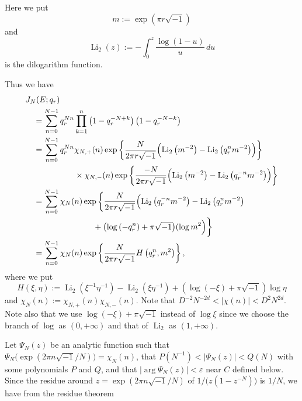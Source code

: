 \documentclass[a4paper]{amsart}
\theoremstyle{plain}
\theoremstyle{definition}
\theoremstyle{remark}
\newcommand{\Li}{\operatorname{Li}}
\numberwithin{equation}{section}
\begin{document}
Here we put
\begin{equation*}
  m:=\exp(\pi{r}\sqrt{-1})
\end{equation*}
and
\begin{equation*}
  \Li_2(z):=-\int_{0}^{z}\frac{\log(1-u)}{u}\,du
\end{equation*}
is the dilogarithm function.
\par
Thus we have
\begin{equation*}
\begin{split}
  &J_{N}(E;q_r)
  \\
  &\quad=
  \sum_{n=0}^{N-1}
  q_r^{Nn}
  \prod_{k=1}^{n}
  \left(1-q_r^{-N+k}\right)
  \left(1-q_r^{-N-k}\right)
  \\
  &\quad=
  \sum_{n=0}^{N-1}
  q_r^{Nn}
  \chi_{N,+}(n)
  \exp
  \left\{
    \frac{N}{2\pi{r}\sqrt{-1}}
    \Bigl(
      \Li_2\left(m^{-2}\right)-\Li_2\left(q_r^{n}m^{-2}\right)
    \Bigr)
  \right\}
  \\
  &\qquad\qquad\qquad\times
  \chi_{N,-}(n)
  \exp
  \left\{
    \frac{-N}{2\pi{r}\sqrt{-1}}
    \Bigl(
      \Li_2\left(m^{-2}\right)-\Li_2\left(q_r^{-n}m^{-2}\right)
    \Bigr)
  \right\}
  \\
  &\quad=
  \sum_{n=0}^{N-1}
  \chi_N(n)
  \exp
  \left\{
    \frac{N}{2\pi{r}\sqrt{-1}}
    \Bigl(
      \Li_2\left(q_r^{-n}m^{-2}\right)-\Li_2\left(q_r^{n}m^{-2}\right)
  \right.
  \\
  &\qquad\qquad\qquad\qquad
  \left.\vphantom{\frac{N}{2\pi{r}\sqrt{-1}}}
      +\bigl(\log\left(-q_r^n\right)+\pi\sqrt{-1}\bigr)(\log{m^2}
    \Bigr)
  \right\}
  \\
  &\quad=
  \sum_{n=0}^{N-1}
  \chi_N(n)
  \exp
  \left\{
    \frac{N}{2\pi{r}\sqrt{-1}}H\left(q_r^n,m^2\right)
  \right\},
\end{split}
\end{equation*}
where we put
\begin{equation*}
  H(\xi,\eta)
  :=
  \Li_2\left(\xi^{-1}\eta^{-1}\right)-\Li_2\left(\xi\eta^{-1}\right)
  +\left(\log(-\xi)+\pi\sqrt{-1}\right)\log{\eta}
\end{equation*}
and $\chi_N(n):=\chi_{N,+}(n)\chi_{N,-}(n)$.
Note that $D^{-2}N^{-2d}<|\chi(n)|<D^2N^{2d}$.
Note also that we use $\log(-\xi)+\pi\sqrt{-1}$ instead of $\log\xi$ since we choose the branch of $\log$ as $(0,+\infty)$ and that of $\Li_2$ as $(1,+\infty)$.
\par
Let $\Psi_N(z)$ be an analytic function such that $\Psi_N\bigl(\exp(2\pi{n}\sqrt{-1}/N)\bigr)=\chi_N(n)$, that $P(N^{-1})<|\Psi_N(z)|<Q(N)$ with some polynomials $P$ and $Q$, and that $|\arg\Psi_N(z)|<\varepsilon$ near $C$ defined below. Since the residue around $z=\exp(2\pi{n}\sqrt{-1}/N)$ of $1/\bigl(z(1-z^{-N})\bigr)$ is $1/N$, we have from the residue theorem
\end{document}
